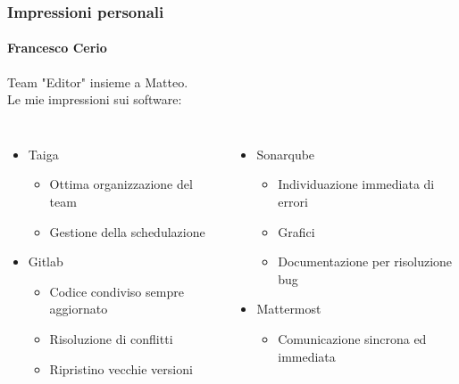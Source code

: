 \documentclass{beamer}
\begin{document}
\begin{frame}
\frametitle{Impressioni personali}
\framesubtitle{Francesco Cerio}

Team "Editor" insieme a Matteo.\\
Le mie impressioni sui software:
\begin{columns}
\begin{itemize}
	\item Taiga
	\begin{itemize}
		\item Ottima organizzazione del team 
		\item Gestione della schedulazione
	\end{itemize}
	\item Gitlab
	\begin{itemize}
		\item Codice condiviso sempre aggiornato 
		\item Risoluzione di conflitti 
		\item Ripristino vecchie versioni
	\end{itemize}
\end{itemize}
\begin{itemize}
	\item Sonarqube
	\begin{itemize}
		\item Individuazione immediata di errori 
		\item Grafici 
		\item Documentazione per risoluzione bug
	\end{itemize}
	\item Mattermost
	\begin{itemize}
		\item Comunicazione sincrona ed immediata
	\end{itemize}
\end{itemize}
\end{columns}
\end{frame}
\end{document}
